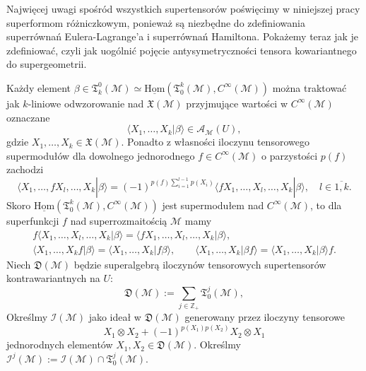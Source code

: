 \documentclass[11pt,a4paper]{report}
\theoremstyle{definition}
\begin{document}
Najwięcej uwagi spośród wszystkich supertensorów poświęcimy w niniejszej pracy superformom różniczkowym, ponieważ są niezbędne do zdefiniowania superrównań Eulera-Lagrange'a i superrównań Hamiltona. Pokażemy teraz jak je zdefiniować, czyli jak uogólnić pojęcie antysymetryczności tensora kowariantnego do supergeometrii.

Każdy element $\beta \in \mathfrak{T}^0_k(\mathcal{M}) \simeq \underline{\mathrm{Hom}} (\mathfrak T^k_0(\mathcal{M}), C^\infty(\mathcal{M}))$ można traktować jak $k$-liniowe odwzorowanie nad $\mathfrak{X} (\mathcal{M})$ przyjmujące wartości w $C^\infty(\mathcal{M})$ oznaczane
\begin{equation*}
\langle X_1,\ldots, X_k|\beta\rangle \in \mathcal{A_M}(U),
\end{equation*}
gdzie $X_1, \ldots, X_k \in \mathfrak{X} (\mathcal{M})$. Ponadto z własności iloczynu tensorowego supermodułów dla dowolnego jednorodnego $f \in C^\infty(\mathcal{M})$ o parzystości $p(f)$ zachodzi
\begin{equation*}
\langle X_1,\ldots, fX_l,\ldots,X_k|\beta \rangle =(-1)^{p(f)\sum_{i=1}^{l-1}p(X_i)}\langle f X_1,\ldots,X_l,\ldots,X_k|\beta\rangle, \quad l \in \overline{1,k}.
\end{equation*}
Skoro $\underline{\mathrm{Hom}} (\mathfrak T^k_0(\mathcal{M}), C^\infty(\mathcal{M}))$ jest supermodułem nad $C^\infty(\mathcal{M})$, to dla superfunkcji $f$ nad superrozmaitością $\mathcal{M}$ mamy
\begin{equation*}
\begin{gathered}
f \langle X_1,\ldots,X_l,\ldots,X_k|\beta\rangle = \langle f X_1,\ldots,X_l,\ldots,X_k|\beta\rangle, \\
\langle X_1,\ldots,X_k f|\beta\rangle = \langle X_1,\ldots,X_k |f \beta\rangle, \qquad 
\langle X_1,\ldots,X_k|\beta f\rangle = \langle X_1,\ldots,X_k|\beta\rangle f.
\end{gathered}
\end{equation*}
Niech $\mathfrak{D}(\mathcal{M})$ będzie superalgebrą iloczynów tensorowych supertensorów kontrawariantnych na $U$:
\begin{equation*}
\mathfrak{D}(\mathcal{M}) := \sum_{j \in \mathbb{Z}_+} \mathfrak T^j_0(\mathcal{M}),
\end{equation*}
Określmy $\mathcal{I(M)}$ jako ideał w $\mathfrak{D}(\mathcal{M})$ generowany przez iloczyny tensorowe
\begin{equation*}
X_1 \otimes X_2 + (-1)^{p(X_1)p(X_2)} X_2 \otimes X_1
\end{equation*}
jednorodnych elementów $X_1, X_2 \in \mathfrak{D}(\mathcal{M})$.
Określmy $\mathcal{I}^j\mathcal{(M)}:=\mathcal{I(M)} \cap \mathfrak T^j_0 \mathcal{(M)}$.
\end{document}
